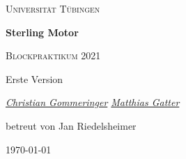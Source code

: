 \documentclass[a4paper, 12pt,]{scrartcl}
\begin{document}
\begin{titlepage}
	\centering
	{\scshape\LARGE Universität Tübingen \par}
	\vspace{2cm}
	{\huge\bfseries Sterling Motor \par}
	\vspace{2cm}
	{\Large \scshape Blockpraktikum 2021} \par
	\vspace{2cm}
	{\Large  Erste Version} \par
	\vspace{2cm}
	{\Large\itshape \underline{Christian Gommeringer} \space \space  \underline{Matthias Gatter}\par}
	\vfill 
	{\large betreut von Jan Riedelsheimer}
	\vfill

	{\large \today\par}
\end{titlepage}
\newpage 




\end{document}
